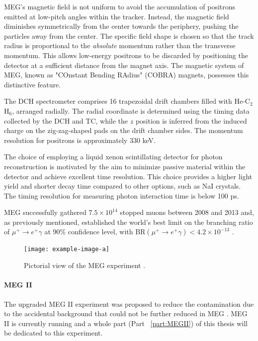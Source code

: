 \begin{refsection}
        MEG's magnetic field is not uniform to avoid the accumulation of positrons emitted at low-pitch angles within the tracker. 
        Instead, the magnetic field diminishes symmetrically from the center towards the periphery, pushing the particles away from the center. 
        The specific field shape is chosen so that the track radius is proportional to the \textit{absolute} momentum rather than the transverse momentum. 
        This allows low-energy positrons to be discarded by positioning the detector at a sufficient distance from the magnet axis. 
        The magnetic system of MEG, known as "COnstant Bending RAdius" (COBRA) magnets, possesses this distinctive feature.

        The DCH spectrometer comprises 16 trapezoidal drift chambers filled with He-C$_2$H$_6$, arranged radially. 
        The radial coordinate is determined using the timing data collected by the DCH and TC, while the $z$ position is inferred from the induced charge on the zig-zag-shaped pads on the drift chamber sides. The momentum resolution for positrons is approximately 330 keV.

        The choice of employing a liquid xenon scintillating detector for photon reconstruction is motivated by the aim to minimize passive material within the detector and achieve excellent time resolution. 
        This choice provides a higher light yield and shorter decay time compared to other options, such as NaI crystals. The timing resolution for measuring photon interaction time is below 100 ps.

        MEG successfully gathered $7.5\times10^{14}$ stopped muons between 2008 and 2013 and, as previously mentioned, established the world's best limit on the branching ratio of $\mu^+\rightarrow e^+\gamma$ at 90\% confidence level, with BR$(\mu^+\rightarrow e^+\gamma)<4.2\times10^{-13}$ \cite{MEG}.

        \begin{figure}[h!]
            \centering
            \texttt{[image: example-image-a]}
            \caption[MEG experiment]{Pictorial view of the MEG experiment \cite{Chiappini}\cite{MEG}.}
            \label{_MEG}
        \end{figure}

        \paragraph{MEG II} 
        The upgraded MEG II experiment was proposed to reduce the contamination due to the accidental background that could not be further reduced in MEG \cite{MEG_upgrade} \cite{MEG_II}.
        MEG II is currently running and a whole part (Part ~\ref{part:MEGII}) of this thesis will be dedicated to this experiment.        
        

\end{refsection}
